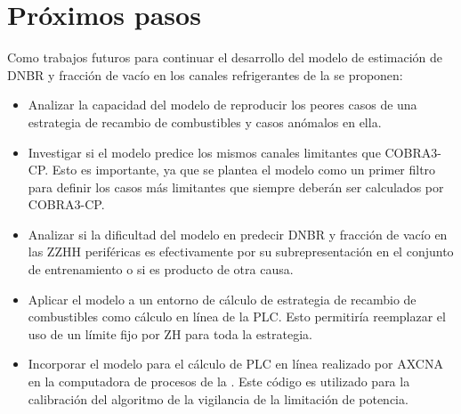 \section{Próximos pasos}
Como trabajos futuros para continuar el desarrollo del modelo de estimación de DNBR y fracción de vacío en los canales refrigerantes de la \cna{} se proponen:
\begin{itemize}
    \item Analizar la capacidad del modelo de reproducir los peores casos de una estrategia de recambio de combustibles y casos anómalos en ella.
    \item Investigar si el modelo predice los mismos canales limitantes que COBRA3-CP. Esto es importante, ya que se plantea el modelo como un primer filtro para definir los casos más limitantes que siempre deberán ser calculados por COBRA3-CP.
    \item Analizar si la dificultad del modelo en predecir DNBR y fracción de vacío en las ZZHH periféricas es efectivamente por su subrepresentación en el conjunto de entrenamiento o si es producto de otra causa.
    \item Aplicar el modelo a un entorno de cálculo de estrategia de recambio de combustibles como cálculo en línea de la PLC. Esto permitiría reemplazar el uso de un límite fijo por ZH para toda la estrategia.
    \item Incorporar el modelo para el cálculo de PLC en línea realizado por AXCNA en la computadora de procesos de la \cna{}. Este código es utilizado para la calibración del algoritmo de la vigilancia de la limitación de potencia.
\end{itemize}

